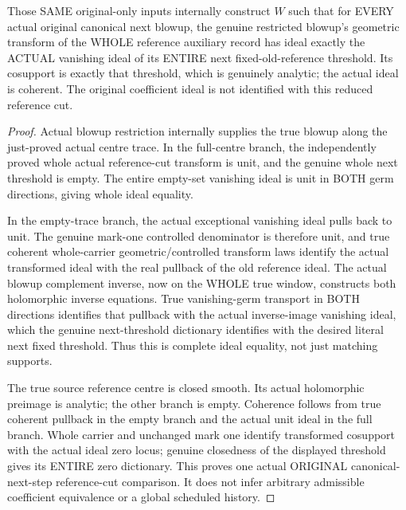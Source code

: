 \begin{theorem}
\label{hir:original-canonical-next-full-reference-whole-ideal-transform}
\leanok
{}
Those SAME original-only inputs internally construct $W$ such that for EVERY
actual original canonical next blowup, the genuine restricted blowup's
geometric transform of the WHOLE reference auxiliary record has ideal
exactly the ACTUAL vanishing ideal of its ENTIRE next fixed-old-reference
threshold. Its cosupport is exactly that threshold, which is genuinely
analytic; the actual ideal is coherent. The original coefficient ideal is
not identified with this reduced reference cut.
\end{theorem}
\begin{proof}
Actual blowup restriction internally supplies the true blowup along the
just-proved actual centre trace. In the full-centre branch, the independently
proved whole actual reference-cut transform is unit, and the genuine whole
next threshold is empty. The entire empty-set vanishing ideal is unit in
BOTH germ directions, giving whole ideal equality.

In the empty-trace branch, the actual exceptional vanishing ideal pulls back
to unit. The genuine mark-one controlled denominator is therefore unit, and
true coherent whole-carrier geometric/controlled transform laws identify the
actual transformed ideal with the real pullback of the old reference ideal.
The actual blowup complement inverse, now on the WHOLE true window, constructs
both holomorphic inverse equations. True vanishing-germ transport in BOTH
directions identifies that pullback with the actual inverse-image vanishing
ideal, which the genuine next-threshold dictionary identifies with the desired
literal next fixed threshold. Thus this is complete ideal equality, not just
matching supports.

The true source reference centre is closed smooth. Its actual holomorphic
preimage is analytic; the other branch is empty. Coherence follows from true
coherent pullback in the empty branch and the actual unit ideal in the full
branch. Whole carrier and unchanged mark one identify transformed cosupport
with the actual ideal zero locus; genuine closedness of the displayed
threshold gives its ENTIRE zero dictionary. This proves one actual ORIGINAL
canonical-next-step reference-cut comparison. It does not infer arbitrary
admissible coefficient equivalence or a global scheduled history.
\end{proof}

